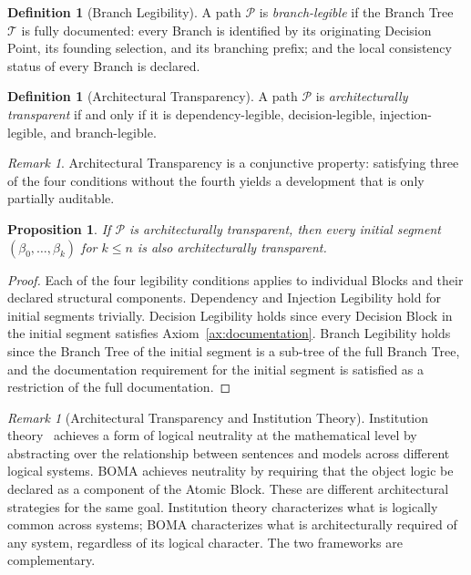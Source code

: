 \documentclass[12pt, a4paper]{article}
\theoremstyle{plain}
\newtheorem{proposition}[theorem]{Proposition}
\theoremstyle{definition}
\newtheorem{definition}[theorem]{Definition}
\theoremstyle{remark}
\newtheorem{remark}[theorem]{Remark}
\newcommand{\BOMA}{\textsf{BOMA}}
\begin{document}
\begin{definition}[Branch Legibility]
\label{def:branch-legible}
A path $\mathcal{P}$ is \emph{branch-legible} if the Branch Tree
$\mathcal{T}$ is fully documented: every Branch is identified by
its originating Decision Point, its founding selection, and its
branching prefix; and the local consistency status of every Branch
is declared.
\end{definition}

\begin{definition}[Architectural Transparency]
\label{def:transparency}
A path $\mathcal{P}$ is \emph{architecturally transparent} if
and only if it is dependency-legible, decision-legible,
injection-legible, and branch-legible.
\end{definition}

\begin{remark}
Architectural Transparency is a conjunctive property: satisfying
three of the four conditions without the fourth yields a
development that is only partially auditable.
\end{remark}

\begin{proposition}
\label{prop:prefix-transparent}
If $\mathcal{P}$ is architecturally transparent, then every
initial segment $(\beta_0, \ldots, \beta_k)$ for $k \leq n$ is
also architecturally transparent.
\end{proposition}

\begin{proof}
Each of the four legibility conditions applies to individual
Blocks and their declared structural components. Dependency and
Injection Legibility hold for initial segments trivially. Decision
Legibility holds since every Decision Block in the initial segment
satisfies Axiom~\ref{ax:documentation}. Branch Legibility holds
since the Branch Tree of the initial segment is a sub-tree of the
full Branch Tree, and the documentation requirement for the initial
segment is satisfied as a restriction of the full documentation.
\end{proof}

\begin{remark}[Architectural Transparency and Institution Theory]
\label{rem:institution}
Institution theory~\cite{GoguenBurstall1992} achieves a form of
logical neutrality at the mathematical level by abstracting over
the relationship between sentences and models across different
logical systems. \BOMA{} achieves neutrality by requiring that
the object logic be declared as a component of the Atomic Block.
These are different architectural strategies for the same goal.
Institution theory characterizes what is logically common across
systems; \BOMA{} characterizes what is architecturally required
of any system, regardless of its logical character. The two
frameworks are complementary.
\end{remark}
\end{document}
